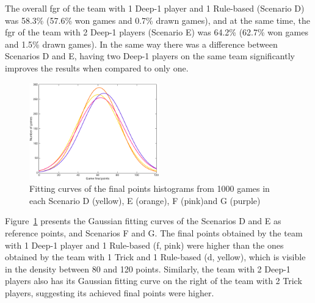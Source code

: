 The overall \ac{fgr} of the team with 1 Deep-1 player and 1 Rule-based (Scenario D) was 58.3\% (57.6\% won games and 0.7\% drawn games), and at the same time, the \ac{fgr} of the team with 2 Deep-1 players (Scenario E) was 64.2\% (62.7\% won games and 1.5\% drawn games).
In the same way there was a difference between Scenarios D and E, having two Deep-1 players on the same team significantly improves the results when compared to only one.

\begin{figure}[h!]
  \centering
    \includegraphics[width=0.5\textwidth]{./img/4/DEFG}
  \caption{Fitting curves of the final points histograms from 1000 games in each Scenario D (yellow), E (orange), F (pink)and G (purple)}
\label{fig:DEFG}
\end{figure}

Figure~\ref{fig:DEFG} presents the Gaussian fitting curves of the Scenarios D and E as reference points, and Scenarios F and G.
The final points obtained by the team with 1 Deep-1 player and 1 Rule-based (f, pink) were higher than the ones obtained by the team with 1 Trick and 1 Rule-based (d, yellow), which is visible in the density between 80 and 120 points.
Similarly, the team with 2 Deep-1 players also has its Gaussian fitting curve on the right of the team with 2 Trick players, suggesting its achieved final points were higher.

